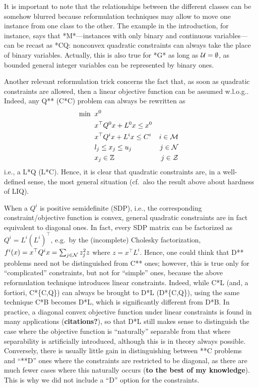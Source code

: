 \smallskip
It is important to note that the relationships between the different classes can be somehow blurred because reformulation techniques may allow to move one instance from one class to the other. The example in the introduction, for instance, says that *M*---instances with only binary and continuous variables---can be recast as *CQ: nonconvex quadratic constraints can always take the place of binary variables. Actually, this is also true for *G* as long as $\mathcal{U} = \emptyset$, as bounded general integer variables can be represented by binary ones.

Another relevant reformulation trick concerns the fact that, as soon as quadratic constraints are allowed, then a linear objective function can be assumed w.l.o.g.. Indeed, any Q** (C*C) problem can always be rewritten as
%
\begin{align*}	
 \min \;\;
 & x^0 \\
 & x^\top Q^0 x + L^0 x \leq x^0 & \\ 
 & x^\top Q^i x + L^i x \leq C^i & i \in \mathcal{M} \\ 
 & l_j \leq x_j \leq u_j & j \in \mathcal{N}  \\
 & x_j \in \mathbb{Z} & j \in \mathcal{Z}
\end{align*}
%
i.e., a L*Q (L*C). Hence, it is clear that quadratic constraints are, in a well-defined sense, the most general situation (cf.~also the result above about hardness of LIQ).

When a $Q^i$ is positive semidefinite (SDP), i.e., the corresponding constraint/objective function is convex, general quadratic constraints are in fact equivalent to diagonal ones. In fact, every SDP matrix can be factorized as $Q^i = L^i (L^i)^\top$, e.g.~by the (incomplete) Cholesky factorization, $f^i(x) = x^\top Q^i x = \sum_{j \in \mathcal{N}} z^2_jz$ where $z = x^\top L^i$. Hence, one could think that D** problems need not be distinguished from C** ones; however, this is true only for ``complicated'' constraints, but not for ``simple'' ones, because the above reformulation technique introduces linear constraints. Indeed, while C*L (and, a fortiori, C*\{C,Q\}) can always be brought to D*L (D*\{C,Q\}), using the same technique C*B becomes D*L, which is significantly different from D*B. In practice, a diagonal convex objective function under linear constraints is found in many applications ({\bf citations?}), so that D*L still makes sense to distinguish the case where the objective function is ``naturally'' separable from that where separability is artificially introduced, although this is in theory always possible. Conversely, there is usually little gain in distinguishing between **C problems and ``**D'' ones where the constraints are restricted to be diagonal, as there are much fewer cases where this naturally occurs ({\bf to the best of my knowledge}). This is why we did not include a ``D'' option for the constraints.


